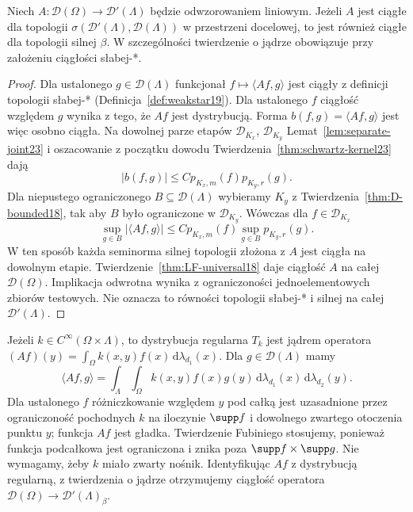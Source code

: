 \begin{wniosek}
\label{cor:dt-kernel-weak-strong}
Niech $A:\mathcal D(\Omega)\to\mathcal D'(\Lambda)$
będzie odwzorowaniem liniowym. Jeżeli $A$ jest ciągłe
dla topologii $\sigma(\mathcal D'(\Lambda),\mathcal D(\Lambda))$
w przestrzeni docelowej, to jest również ciągłe
dla topologii silnej $\beta$. W szczególności twierdzenie
o jądrze obowiązuje przy założeniu ciągłości słabej-*.
\end{wniosek}
\begin{proof}
Dla ustalonego $g\in\mathcal D(\Lambda)$ funkcjonał
$f\mapsto\langle Af,g\rangle$ jest ciągły z definicji
topologii słabej-* (Definicja~\ref{def:weakstar19}).
Dla ustalonego $f$ ciągłość względem $g$ wynika
z tego, że $Af$ jest dystrybucją. Forma
$b(f,g)=\langle Af,g\rangle$ jest więc osobno ciągła.
Na dowolnej parze etapów $\mathcal D_{K_x}$,
$\mathcal D_{K_y}$ Lemat~\ref{lem:separate-joint23}
i oszacowanie z początku dowodu
Twierdzenia~\ref{thm:schwartz-kernel23} dają
\[
 |b(f,g)|\le C p_{K_x,m}(f)p_{K_y,r}(g).
\]
Dla niepustego ograniczonego $B\subseteq\mathcal D(\Lambda)$
wybieramy $K_y$ z Twierdzenia~\ref{thm:D-bounded18},
tak aby $B$ było ograniczone w $\mathcal D_{K_y}$.
Wówczas dla $f\in\mathcal D_{K_x}$
\[
 \sup_{g\in B}|\langle Af,g\rangle|
 \le C p_{K_x,m}(f)\sup_{g\in B}p_{K_y,r}(g).
\]
W ten sposób każda seminorma silnej topologii
złożona z $A$ jest ciągła na dowolnym etapie.
Twierdzenie~\ref{thm:LF-universal18} daje ciągłość
$A$ na całej $\mathcal D(\Omega)$.
Implikacja odwrotna wynika z ograniczoności
jednoelementowych zbiorów testowych. Nie oznacza
to równości topologii słabej-* i silnej na całej
$\mathcal D'(\Lambda)$.
\end{proof}

\begin{przyklad}
\label{ex:smooth-kernel23}
Jeżeli $k\in C^\infty(\Omega\times\Lambda)$, to dystrybucja
regularna $T_k$ jest jądrem operatora
$(Af)(y)=\int_\Omega k(x,y)f(x)\,\mathrm d\lambda_{d_1}(x)$.
Dla $g\in\mathcal D(\Lambda)$ mamy
\[
\langle Af,g\rangle
=\int_{\Lambda}\int_{\Omega}k(x,y)f(x)g(y)
\,\mathrm d\lambda_{d_1}(x)\,\mathrm d\lambda_{d_2}(y).
\]
Dla ustalonego $f$ różniczkowanie względem $y$
pod całką jest uzasadnione przez ograniczoność pochodnych
$k$ na iloczynie $\supp f$ i dowolnego zwartego
otoczenia punktu $y$; funkcja $Af$ jest gładka.
Twierdzenie Fubiniego stosujemy, ponieważ funkcja
podcałkowa jest ograniczona i znika poza
$\supp f\times\supp g$. Nie wymagamy, żeby $k$
miało zwarty nośnik. Identyfikując $Af$ z dystrybucją
regularną, z twierdzenia o jądrze otrzymujemy
ciągłość operatora $\mathcal D(\Omega)\to
\mathcal D'(\Lambda)_\beta$.
\end{przyklad}

